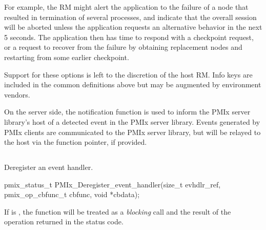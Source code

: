 For example, the \ac{RM} might alert the application to the failure of a node that resulted in termination of several processes, and indicate that the overall session will be aborted unless the application requests an alternative behavior in the next 5 seconds. The application then has time to respond with a checkpoint request, or a request to recover from the failure by obtaining replacement nodes and restarting from some earlier checkpoint.

Support for these options is left to the discretion of the host \ac{RM}. Info keys are included in the common definitions above but may be augmented by environment vendors.
\adviceuserend

\advicermstart
On the server side, the notification function is used to inform the \ac{PMIx} server library's host of a detected event in the \ac{PMIx} server library. Events generated by \ac{PMIx} clients are communicated to the \ac{PMIx} server library, but will be relayed to the host via the  function pointer, if provided.
\advicermend



\subsection{}

\summary

Deregister an event handler.

\format

\cspecificstart
\begin{codepar}
pmix_status_t
PMIx_Deregister_event_handler(size_t evhdlr_ref,
                              pmix_op_cbfunc_t cbfunc,
                              void *cbdata);
\end{codepar}
\cspecificend

\begin{arglist}
\end{arglist}

If  is , the function will be treated as a \emph{blocking} call and the result of the operation returned in the status code.

